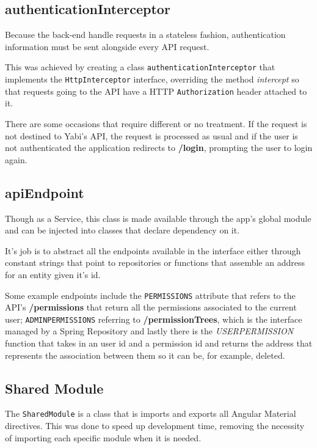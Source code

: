 \subsection{authenticationInterceptor}
Because the back-end handle requests in a stateless fashion, authentication information must be sent alongside every \gls{API} request.

This was achieved by creating a class \texttt{authenticationInterceptor} that implements the \texttt{HttpInterceptor} interface, overriding the method \textit{intercept} so that requests going to the \gls{API} have a \gls{HTTP} \texttt{Authorization} header attached to it.

There are some occasions that require different or no treatment. If the request is not destined to \gls{Yabi}'s \gls{API}, the request is processed as usual and if the user is not authenticated the application redirects to \textbf{/login}, prompting the user to login again.

\subsection{apiEndpoint}
Though as a Service, this class is made available through the app's global module and can be injected into classes that declare dependency on it.

It's job is to abstract all the endpoints available in the interface either through constant strings that point to repositories or functions that assemble an address for an entity given it's id.

Some example endpoints include the \texttt{PERMISSIONS} attribute that refers to the \gls{API}'s \textbf{/permissions} that return all the permissions associated to the current user; \texttt{ADMIN\textunderscore PERMISSIONS} referring to \textbf{/permissionTrees}, which is the interface managed by a Spring Repository and lastly there is the \textit{USER\textunderscore PERMISSION} function that takes in an user id and a permission id and returns the address that represents the association between them so it can be, for example, deleted.

\subsection{Shared Module}
The \texttt{SharedModule} is a class that is imports and exports all Angular Material directives. This was done to speed up development time, removing the necessity of importing each specific module when it is needed.

